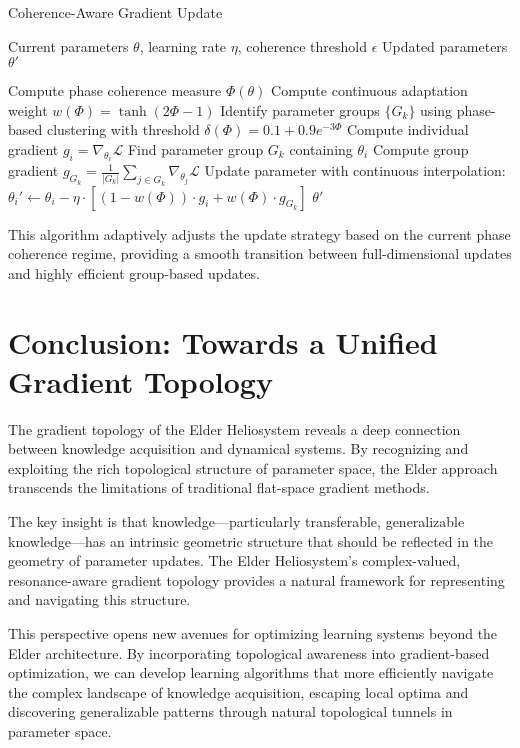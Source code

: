 \begin{algorithm}
\caption{Coherence-Aware Gradient Update}
\begin{algorithmic}[1]
\Require Current parameters $\theta$, learning rate $\eta$, coherence threshold $\epsilon$
\Ensure Updated parameters $\theta'$

\State Compute phase coherence measure $\Phi(\theta)$
\State Compute continuous adaptation weight $w(\Phi) = \tanh(2\Phi - 1)$
\State Identify parameter groups $\{G_k\}$ using phase-based clustering with threshold $\delta(\Phi) = 0.1 + 0.9e^{-3\Phi}$
    \State Compute individual gradient $g_i = \nabla_{\theta_i} \mathcal{L}$
    \State Find parameter group $G_k$ containing $\theta_i$
    \State Compute group gradient $g_{G_k} = \frac{1}{|G_k|} \sum_{j \in G_k} \nabla_{\theta_j} \mathcal{L}$
    \State Update parameter with continuous interpolation:
    \State $\theta_i' \leftarrow \theta_i - \eta \cdot \left[ (1-w(\Phi)) \cdot g_i + w(\Phi) \cdot g_{G_k} \right]$
\EndFor
\State \Return $\theta'$
\end{algorithmic}
\end{algorithm}

This algorithm adaptively adjusts the update strategy based on the current phase coherence regime, providing a smooth transition between full-dimensional updates and highly efficient group-based updates.

\section{Conclusion: Towards a Unified Gradient Topology}

The gradient topology of the Elder Heliosystem reveals a deep connection between knowledge acquisition and dynamical systems. By recognizing and exploiting the rich topological structure of parameter space, the Elder approach transcends the limitations of traditional flat-space gradient methods.

The key insight is that knowledge—particularly transferable, generalizable knowledge—has an intrinsic geometric structure that should be reflected in the geometry of parameter updates. The Elder Heliosystem's complex-valued, resonance-aware gradient topology provides a natural framework for representing and navigating this structure.

This perspective opens new avenues for optimizing learning systems beyond the Elder architecture. By incorporating topological awareness into gradient-based optimization, we can develop learning algorithms that more efficiently navigate the complex landscape of knowledge acquisition, escaping local optima and discovering generalizable patterns through natural topological tunnels in parameter space.
